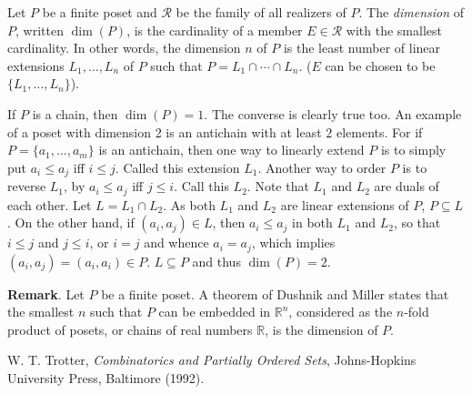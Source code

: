 \documentclass[12pt]{article}
\begin{document}
Let $P$ be a finite poset and $\mathcal{R}$ be the family of all realizers of $P$.  The \emph{dimension} of $P$, written $\operatorname{dim}(P)$, is the cardinality of a member $E\in \mathcal{R}$ with the smallest cardinality.  In other words, the dimension $n$ of $P$ is the least number of linear extensions $L_1,\ldots,L_n$ of $P$ such that $P=L_1\cap \cdots \cap L_n$.  ($E$ can be chosen to be $\lbrace L_1,\ldots, L_n\rbrace$).

If $P$ is a chain, then $\operatorname{dim}(P)=1$.  The converse is clearly true too.  An example of a poset with dimension 2 is an antichain with at least $2$ elements.  For if $P=\lbrace a_1,\ldots, a_m\rbrace$ is an antichain, then one way to linearly extend $P$ is to simply put $a_i\le a_j$ iff $i\le j$.  Called this extension $L_1$.  Another way to order $P$ is to reverse $L_1$, by $a_i\le a_j$ iff $j\le i$.  Call this $L_2$.  Note that $L_1$ and $L_2$ are duals of each other.  Let $L=L_1\cap L_2$.  As both $L_1$ and $L_2$ are linear extensions of $P$, $P\subseteq L$.  On the other hand, if $(a_i,a_j)\in L$, then $a_i\le a_j$ in both $L_1$ and $L_2$, so that $i\le j$ and $j\le i$, or $i=j$ and whence $a_i=a_j$, which implies $(a_i,a_j)=(a_i,a_i)\in P$.  $L\subseteq P$ and thus $\operatorname{dim}(P)=2$.

\textbf{Remark}.  Let $P$ be a finite poset.  A theorem of Dushnik and Miller states that the smallest $n$ such that $P$ can be embedded in $\mathbb{R}^n$, considered as the $n$-fold product of posets, or chains of real numbers $\mathbb{R}$, is the dimension of $P$.

\begin{thebibliography}{8}
 W. T. Trotter, {\em Combinatorics and Partially Ordered Sets}, Johns-Hopkins University Press, Baltimore (1992).
\end{thebibliography}
\end{document}
